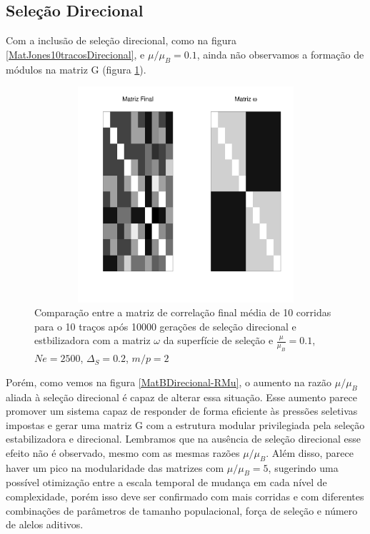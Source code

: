 \subsection{Seleção Direcional}

Com a inclusão de seleção direcional, como na figura
\ref{MatJones10tracosDirecional}, e $\mu/\mu_B = 0.1$, ainda não
observamos a formação de módulos na matriz G (figura \ref{RMu01}). 

\begin{center}
\begin{figure}[htbp]
  \includegraphics[width=150mm, height=80mm]{figuras/RMu01Omega}
   \caption{Comparação entre a matriz de correlação final média de 10
   corridas para o 10 traços após 10000
   gerações de seleção direcional e estbilizadora com a matriz $\omega$ da superfície de seleção e $\frac{\mu}{\mu_B}=0.1$, $Ne=2500$, $\Delta_S=0.2$, $m/p=2$}
  \label{RMu01}
\end{figure}
\end{center}

Porém, como vemos na figura \ref{MatBDirecional-RMu}, o aumento  na
razão $\mu/\mu_B$ aliada à seleção direcional é capaz de alterar essa
situação. 
Esse aumento parece promover um sistema capaz de responder de forma
eficiente às pressões seletivas impostas e gerar uma matriz G com a
estrutura modular privilegiada pela seleção estabilizadora e direcional. 
Lembramos que na ausência de seleção direcional esse efeito não é
observado, mesmo com as mesmas razões $\mu/\mu_B$. 
Além disso, parece haver um pico na modularidade das matrizes com
$\mu/\mu_B = 5$, sugerindo uma possível otimização entre a escala
temporal de mudança em cada nível de complexidade, porém isso deve ser
confirmado com mais corridas e com diferentes combinações de parâmetros
de tamanho populacional, força de seleção e número de alelos aditivos. 

